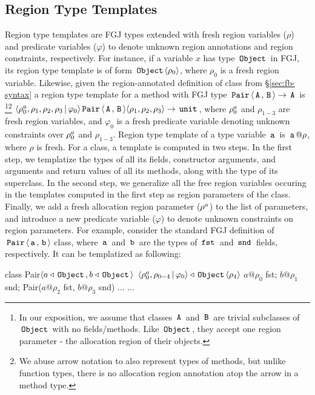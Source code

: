 \subsection{Region Type Templates}
\label{sec:fb-templatization}

Region type templates are FGJ types extended with fresh region
variables ($\rho$) and predicate variables ($\varphi$) to denote
unknown region annotations and region constraints, respectively. For
instance, if a variable $x$ has type $\,{\tt Object}\,$ in FGJ, its region type
template is of form $\,{\tt Object}\,\langle \rho_0 \rangle$, where $\rho_0$ is a fresh
region variable. Likewise, given the region-annotated definition of
 class from \S\ref{sec:fb-syntax} a region type template for a
method with FGJ type $\,{\tt Pair}\,\langle \,{\tt A}\,,\,{\tt B}\, \rangle \rightarrow \,{\tt A}\,$
is \footnote{In our exposition, we assume that classes $\,{\tt A}\,$ and
$\,{\tt B}\,$ are trivial subclasses of $\,{\tt Object}\,$ with no fields/methods. Like
$\,{\tt Object}\,$, they accept one region parameter - the allocation region of
their objects.}\footnote{We abuse arrow notation to also represent
types of methods, but unlike function types, there is no allocation
region annotation atop the arrow in a method type.}
$\langle \rho^a_0,\rho_1,\rho_2,\rho_3 \,|\, \varphi_0 \rangle
\,{\tt Pair}\,\langle \,{\tt A}\,,\,{\tt B}\, \rangle \langle \rho_1,\rho_2,\rho_3 \rangle \rightarrow
\,{\tt unit}\,$, where $\rho^a_0$ and $\rho_{1-3}$ are fresh region
variables, and $\varphi_0$ is a fresh predicate variable denoting
unknown constraints over $\rho^a_0$ and $\rho_{1-3}$.  Region type
template of a type variable $\,{\tt a}\,$ is $\,{\tt a}\,@\rho$, where $\rho$ is
fresh. For a class, a template is computed in two steps. In the first
step, we templatize the types of all its fields, constructor
arguments, and arguments and return values of all its methods, along
with the type of its superclass. In the second step, we generalize all
the free region variables occuring in the templates computed in the
first step as region parameters of the class. Finally, we add a fresh
allocation region parameter ($\rho^a$) to the list of parameters,
and introduce a new predicate variable ($\varphi$) to denote unknown
constraints on region parameters. For example, consider the standard
FGJ definition of $\,{\tt Pair}\,\langle \,{\tt a}\,,\,{\tt b}\, \rangle$ class, where $\,{\tt a}\,$
and $\,{\tt b}\,$ are the types of $\,{\tt fst}\,$ and $\,{\tt snd}\,$ fields,
respectively. It can be templatized as following:
\begin{center}
\begin{codejava}
class Pair$\langle a\triangleleft\,{\tt Object}\,, b\triangleleft\,{\tt Object}\, \rangle$
          $\langle \rho^a_0,\rho_{0-4}\,|\,\varphi_0 \rangle \triangleleft \,{\tt Object}\,\langle \rho_4 \rangle$ {
  $a@\rho_0$ fst;
  $b@\rho_1$ snd;
  Pair($a@\rho_2$ fst, $b@\rho_3$ snd) { $...$ }
  $...$
}
\end{codejava}
\end{center}
